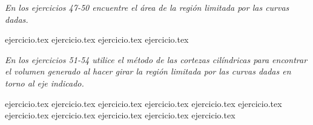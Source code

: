 \vspace{0.5cm}
\noindent\textit{En los ejercicios 47-50 encuentre el área de la región limitada por las curvas dadas.}
\begin{enumerate}
    \setcounter{enumi}{46}
    {ejercicio.tex}
{ejercicio.tex}
{ejercicio.tex}
{ejercicio.tex}
\end{enumerate}

\vspace{0.5cm}
\noindent\textit{En los ejercicios 51-54 utilice el método de las cortezas cilíndricas para encontrar el volumen generado al hacer girar la región limitada por las curvas dadas en torno al eje indicado.}
\begin{enumerate}
    \setcounter{enumi}{50}
    {ejercicio.tex}
{ejercicio.tex}
{ejercicio.tex}
{ejercicio.tex}
{ejercicio.tex}
{ejercicio.tex}
{ejercicio.tex}
{ejercicio.tex}
{ejercicio.tex}
{ejercicio.tex}
{ejercicio.tex}
\end{enumerate}
